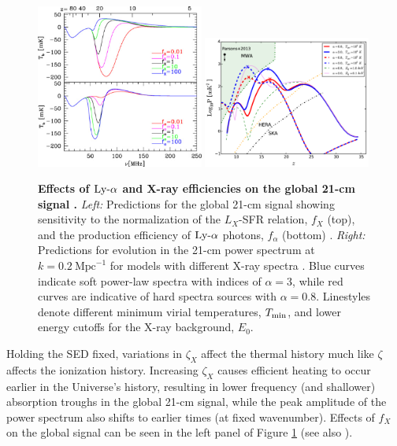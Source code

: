 \begin{figure}[]
\begin{center}
\includegraphics[width=0.49\textwidth]{Mirocha/pritchard2012_fafX.pdf}
\includegraphics[width=0.49\textwidth]{Mirocha/pacucci2014_fig5.pdf}
\end{center}
\caption{{\bf Effects of $\text{Ly-}\alpha$ and X-ray efficiencies on the global 21-cm signal \cite{Pritchard2010,Pacucci2014}.} \textit{Left:} Predictions for the global 21-cm signal showing sensitivity to the normalization of the $L_X$-SFR relation, $f_X$ (top), and the production efficiency of $\text{Ly-}\alpha$ photons, $f_{\alpha}$ (bottom) \cite{Pritchard2010}. \textit{Right:} Predictions for evolution in the 21-cm power spectrum at $k=0.2 \ \mathrm{Mpc}^{-1}$ for models with different X-ray spectra \cite{Pacucci2014}. Blue curves indicate soft power-law spectra with indices of $\alpha=3$, while red curves are indicative of hard spectra sources with $\alpha=0.8$. Linestyles denote different minimum virial temperatures, $T_{\min}$, and lower energy cutoffs for the X-ray background, $E_0$.}
\label{fig:fX}
\end{figure}

Holding the SED fixed, variations in $\zeta_X$ affect the thermal history much like $\zeta$ affects the ionization history. Increasing $\zeta_X$ causes efficient heating to occur earlier in the Universe's history, resulting in lower frequency (and shallower) absorption troughs in the global 21-cm signal, while the peak amplitude of the power spectrum also shifts to earlier times (at fixed wavenumber). Effects of $f_X$ on the global signal can be seen in the left panel of Figure \ref{fig:fX} (see also \cite{Mirabel2011,Mirocha2014,Fialkov2014b}).

